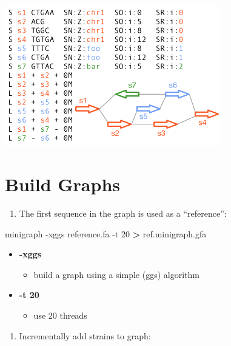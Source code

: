 \documentclass[
]{book}
\newenvironment{Shaded}{\begin{snugshade}}{\end{snugshade}}
\newcommand{\AttributeTok}[1]{\textcolor[rgb]{0.77,0.63,0.00}{#1}}
\newcommand{\ExtensionTok}[1]{#1}
\newcommand{\NormalTok}[1]{#1}
\newcommand{\OperatorTok}[1]{\textcolor[rgb]{0.81,0.36,0.00}{\textbf{#1}}}
\providecommand{\tightlist}{%
  \setlength{\itemsep}{0pt}\setlength{\parskip}{0pt}}
\begin{document}
\includegraphics[width=0.7\textwidth,height=\textheight]{./Figures/rGFA2.png}

\hypertarget{build-graphs}{%
\section{Build Graphs}\label{build-graphs}}

\begin{enumerate}
\def\labelenumi{\arabic{enumi}.}
\tightlist
\item
  The first sequence in the graph is used as a ``reference'':
\end{enumerate}

\begin{Shaded}
\begin{Highlighting}[]
\ExtensionTok{minigraph} \AttributeTok{{-}xggs}\NormalTok{ reference.fa }\AttributeTok{{-}t}\NormalTok{ 20 }\OperatorTok{\textgreater{}}\NormalTok{ ref.minigraph.gfa}
\end{Highlighting}
\end{Shaded}

\begin{itemize}
\tightlist
\item
  \textbf{-xggs}

  \begin{itemize}
  \tightlist
  \item
    build a graph using a simple (ggs) algorithm
  \end{itemize}
\item
  \textbf{-t 20}

  \begin{itemize}
  \tightlist
  \item
    use 20 threads
  \end{itemize}
\end{itemize}

\begin{enumerate}
\def\labelenumi{\arabic{enumi}.}
\setcounter{enumi}{1}
\tightlist
\item
  Incrementally add strains to graph:
\end{enumerate}
\end{document}
